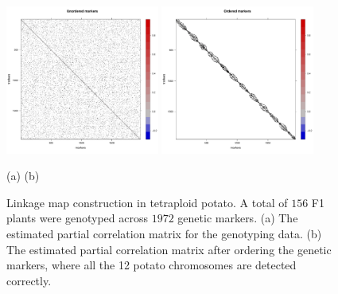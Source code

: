 \begin{figure}[t]
	\centering
	\includegraphics[width=0.45\textwidth]{Fig3a.pdf} \hspace{0.5cm}
	\includegraphics[width=0.45\textwidth]{Fig3b.pdf} 
	
	(a) \hspace{6.5cm}  (b)
	\vspace{-0.3cm}
	\caption{Linkage map construction in tetraploid potato. A total of $156$ F1 plants were genotyped across $1972$ genetic markers. (a) The estimated partial correlation matrix for the genotyping data. (b) The estimated partial correlation matrix after ordering the genetic markers, where %
		all the 12 potato chromosomes %
		are detected correctly.} %
	\label{potato2015}
\end{figure}

